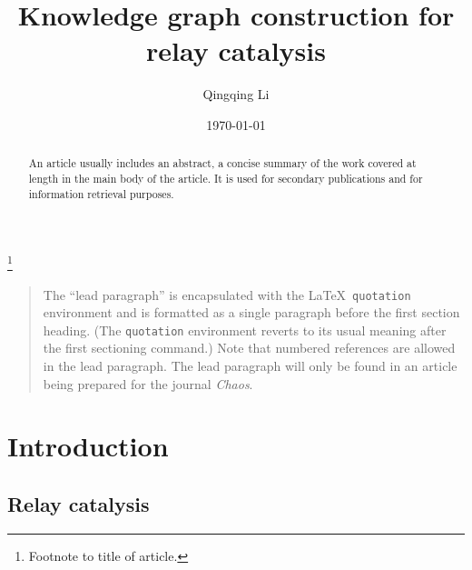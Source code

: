 \documentclass[%
 aip,
 jmp,%
 amsmath,amssymb,
 reprint,%
]{revtex4-2}
\begin{document}

\title[Knowledge graph construction for relay catalysis]{Knowledge graph construction for relay catalysis}%
\thanks{Footnote to title of article.}

\author{Qingqing Li}

\date{\today}%

\begin{abstract}
An article usually includes an abstract, a concise summary of the work
covered at length in the main body of the article. It is used for
secondary publications and for information retrieval purposes. 
%
\end{abstract}

\maketitle

\begin{quotation}
The ``lead paragraph'' is encapsulated with the \LaTeX\ 
\verb+quotation+ environment and is formatted as a single paragraph before the first section heading. 
(The \verb+quotation+ environment reverts to its usual meaning after the first sectioning command.) 
Note that numbered references are allowed in the lead paragraph.
%
The lead paragraph will only be found in an article being prepared for the journal \textit{Chaos}.
\end{quotation}


\section{Introduction}


\subsection{Relay catalysis}
\end{document}
